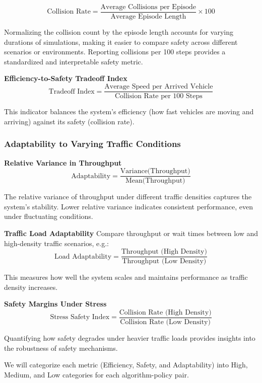 \[
\text{Collision Rate} = \frac{\text{Average Collisions per Episode}}{\text{Average Episode Length}} \times 100
\]

Normalizing the collision count by the episode length accounts for varying durations of simulations, making it easier to compare safety across different scenarios or environments. Reporting collisions per 100 steps provides a standardized and interpretable safety metric.


\textbf{Efficiency-to-Safety Tradeoff Index}
\[
\text{Tradeoff Index} = \frac{\text{Average Speed per Arrived Vehicle}}{\text{Collision Rate per 100 Steps}}
\]

This indicator balances the system's efficiency (how fast vehicles are moving and arriving) against its safety (collision rate).




\subsubsection{Adaptability to Varying Traffic Conditions}

\textbf{Relative Variance in Throughput}
\[
\text{Adaptability} = \frac{\text{Variance(Throughput)}}{\text{Mean(Throughput)}}
\]

The relative variance of throughput under different traffic densities captures the system's stability. Lower relative variance indicates consistent performance, even under fluctuating conditions.



\textbf{Traffic Load Adaptability} 
Compare throughput or wait times between low and high-density traffic scenarios, e.g.:
\[
\text{Load Adaptability} = \frac{\text{Throughput (High Density)}}{\text{Throughput (Low Density)}}
\]

This measures how well the system scales and maintains performance as traffic density increases.


\textbf{Safety Margins Under Stress}
\[
\text{Stress Safety Index} = \frac{\text{Collision Rate (High Density)}}{\text{Collision Rate (Low Density)}}
\]

Quantifying how safety degrades under heavier traffic loads provides insights into the robustness of safety mechanisms.


We will categorize each metric (Efficiency, Safety, and Adaptability) into High, Medium, and Low categories for each algorithm-policy pair.

